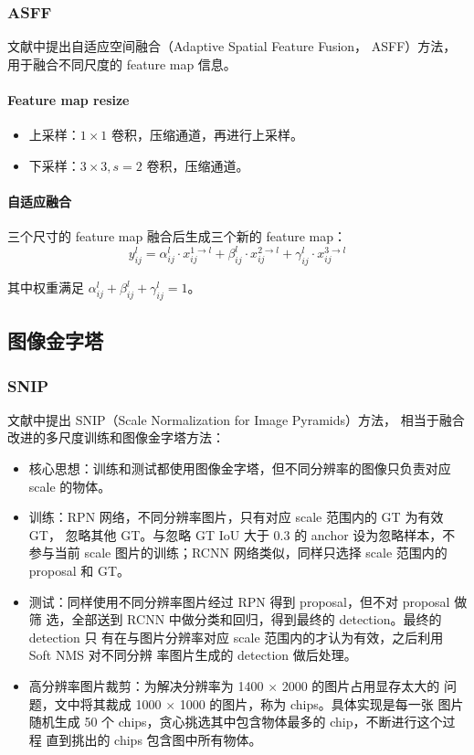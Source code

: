\subsubsection{ASFF}
文献中提出自适应空间融合（Adaptive Spatial Feature Fusion，
ASFF）方法，用于融合不同尺度的 feature map 信息。

\paragraph{Feature map resize}
\begin{itemize}
  \item 上采样：$1 \times 1$ 卷积，压缩通道，再进行上采样。
  \item 下采样：$3 \times 3, s = 2$ 卷积，压缩通道。
\end{itemize}

\paragraph{自适应融合}
三个尺寸的 feature map 融合后生成三个新的 feature map：
\begin{equation}
  y_{ij}^l = \alpha_{ij}^l \cdot x_{ij}^{1 \rightarrow l} + \beta_{ij}^l \cdot x_{ij}^{2 \rightarrow l}
  + \gamma_{ij}^l \cdot x_{ij}^{3 \rightarrow l}
\end{equation}

其中权重满足 $\alpha_{ij}^l + \beta_{ij}^l + \gamma_{ij}^l = 1$。

\subsection{图像金字塔}

\subsubsection{SNIP}
文献中提出 SNIP（Scale Normalization for Image Pyramids）方法，
相当于融合改进的多尺度训练和图像金字塔方法：

\begin{itemize}
  \item 核心思想：训练和测试都使用图像金字塔，但不同分辨率的图像只负责对应
    scale 的物体。
  \item 训练：RPN 网络，不同分辨率图片，只有对应 scale 范围内的 GT 为有效 GT，
    忽略其他 GT。与忽略 GT IoU 大于 0.3 的 anchor 设为忽略样本，不参与当前 scale
    图片的训练；RCNN 网络类似，同样只选择 scale 范围内的 proposal 和 GT。
  \item 测试：同样使用不同分辨率图片经过 RPN 得到 proposal，但不对 proposal 做筛
    选，全部送到 RCNN 中做分类和回归，得到最终的 detection。最终的 detection 只
    有在与图片分辨率对应 scale 范围内的才认为有效，之后利用 Soft NMS 对不同分辨
    率图片生成的 detection 做后处理。
  \item 高分辨率图片裁剪：为解决分辨率为 1400 $\times$ 2000 的图片占用显存太大的
    问题，文中将其裁成 1000 $\times$ 1000 的图片，称为 chips。具体实现是每一张
    图片随机生成 50 个 chips，贪心挑选其中包含物体最多的 chip，不断进行这个过程
    直到挑出的 chips 包含图中所有物体。
\end{itemize}

